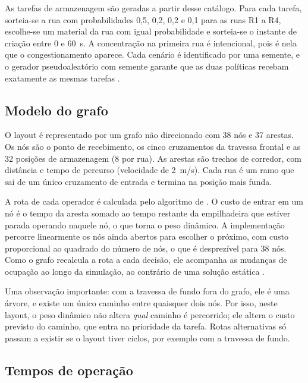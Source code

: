 \documentclass[
	article,
	11pt,
	oneside,
	a4paper,
	english,
	brazil,
	sumario=tradicional
	]{abntex2}
\begin{document}
As tarefas de armazenagem são geradas a partir desse catálogo. Para cada tarefa,
sorteia-se a rua com probabilidades 0,5, 0,2, 0,2 e 0,1 para as ruas R1 a R4,
escolhe-se um material da rua com igual probabilidade e sorteia-se o instante
de criação entre 0 e 60~s. A concentração na primeira rua é intencional, pois é
nela que o congestionamento aparece. Cada cenário é identificado por uma
semente, e o gerador pseudoaleatório com semente garante que as duas políticas
recebam exatamente as mesmas tarefas \cite{law2000}.

\subsection{Modelo do grafo}

O layout é representado por um grafo não direcionado com 38 nós e 37 arestas. Os
nós são o ponto de recebimento, os cinco cruzamentos da travessa frontal e as
32 posições de armazenagem (8 por rua). As arestas são trechos de corredor,
com distância e tempo de percurso (velocidade de 2~m/s). Cada rua é um ramo que
sai de um único cruzamento de entrada e termina na posição mais funda.

A rota de cada operador é calculada pelo algoritmo de .
O custo de entrar em um nó é o tempo da aresta somado ao tempo restante da
empilhadeira que estiver parada operando naquele nó, o que torna o peso
dinâmico. A implementação percorre linearmente os nós ainda abertos para
escolher o próximo, com custo proporcional ao quadrado do número de nós, o que
é desprezível para 38 nós. Como o grafo recalcula a rota a cada decisão, ele
acompanha as mudanças de ocupação ao longo da simulação, ao contrário de uma
solução estática \cite{ramalingam1996}.

Uma observação importante: com a travessa de fundo fora do grafo, ele é uma
árvore, e existe um único caminho entre quaisquer dois nós. Por isso, neste
layout, o peso dinâmico não altera \emph{qual} caminho é percorrido; ele altera
o custo previsto do caminho, que entra na prioridade da tarefa. Rotas
alternativas só passam a existir se o layout tiver ciclos, por exemplo com a
travessa de fundo.

\subsection{Tempos de operação}
\end{document}
